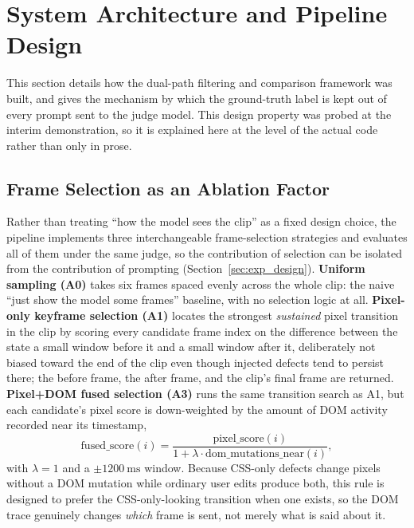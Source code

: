 \section{System Architecture and Pipeline Design}
\label{sec:system_architecture}
This section details how the dual-path filtering and comparison framework was built, and gives the mechanism by which the ground-truth label is kept out of every prompt sent to the judge model. This design property was probed at the interim demonstration, so it is explained here at the level of the actual code rather than only in prose.

\subsection{Frame Selection as an Ablation Factor}
\label{sec:system_architecture-selection}
Rather than treating ``how the model sees the clip'' as a fixed design choice, the pipeline implements three interchangeable frame-selection strategies and evaluates all of them under the same judge, so the contribution of selection can be isolated from the contribution of prompting (Section~\ref{sec:exp_design}). \textbf{Uniform sampling (A0)} takes six frames spaced evenly across the whole clip: the naive ``just show the model some frames'' baseline, with no selection logic at all. \textbf{Pixel-only keyframe selection (A1)} locates the strongest \emph{sustained} pixel transition in the clip by scoring every candidate frame index on the difference between the state a small window before it and a small window after it, deliberately not biased toward the end of the clip even though injected defects tend to persist there; the before frame, the after frame, and the clip's final frame are returned. \textbf{Pixel+DOM fused selection (A3)} runs the same transition search as A1, but each candidate's pixel score is down-weighted by the amount of DOM activity recorded near its timestamp,
\begin{equation}
\text{fused\_score}(i) = \frac{\text{pixel\_score}(i)}{1 + \lambda \cdot \text{dom\_mutations\_near}(i)},
\end{equation}
with $\lambda = 1$ and a $\pm\SI{1200}{\milli\second}$ window. Because CSS-only defects change pixels without a DOM mutation while ordinary user edits produce both, this rule is designed to prefer the CSS-only-looking transition when one exists, so the DOM trace genuinely changes \emph{which} frame is sent, not merely what is said about it.
\label{sec:system_architecture-fusion}


